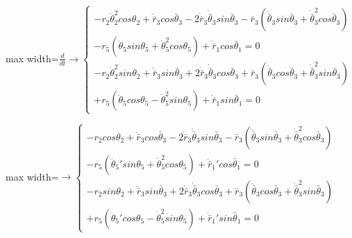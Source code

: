 \documentclass[11pt,a4paper]{article}
\begin{document}
\begin{center}\begin{adjustbox}{max width=\linewidth}$\displaystyle \frac{d}{dt}\rightarrow \left\{ \begin{gathered}-{r}_{2}{\dot{\theta }}_{2}^{2}cos{\theta }_{2}+{\ddot{\bar{r}}}_{3}cos{\bar{\theta }}_{3}-2{\dot{\bar{r}}}_{3}{\dot{\bar{\theta }}}_{3}sin{\bar{\theta }}_{3}-{\bar{r}}_{3}\left( {\ddot{\bar{\theta }}}_{3}sin{\bar{\theta }}_{3}+{\dot{\bar{\theta }}}_{3}^{2}cos{\bar{\theta }}_{3}\right)\\-{r}_{5}\left( {\ddot{\theta }}_{5}sin{\theta }_{5}+{\dot{\theta }}_{5}^{2}cos{\theta }_{5}\right)+{\ddot{\bar{r}}}_{1}cos{\bar{\theta }}_{1}=0\\-{r}_{2}{\dot{\theta }}_{2}^{2}sin{\theta }_{2}+{\ddot{\bar{r}}}_{3}sin{\bar{\theta }}_{3}+2{\dot{\bar{r}}}_{3}{\dot{\bar{\theta }}}_{3}cos{\bar{\theta }}_{3}+{\bar{r}}_{3}\left( {\ddot{\bar{\theta }}}_{3}cos{\bar{\theta }}_{3}+{\dot{\bar{\theta }}}_{3}^{2}sin{\bar{\theta }}_{3}\right)\\+{r}_{5}\left( {\ddot{\theta }}_{5}cos{\theta }_{5}-{\dot{\theta }}_{5}^{2}sin{\theta }_{5}\right)+{\ddot{\bar{r}}}_{1}sin{\bar{\theta }}_{1}=0\end{gathered}\right.$\end{adjustbox}\end{center}

\begin{center}\begin{adjustbox}{max width=\linewidth}$\displaystyle \rightarrow \left\{ \begin{gathered}-{r}_{2}cos{\theta }_{2}+{\ddot{\bar{r}}}_{3}cos{\bar{\theta }}_{3}-2{\dot{\bar{r}}}_{3}{\dot{\bar{\theta }}}_{3}sin{\bar{\theta }}_{3}-{\bar{r}}_{3}\left( {\ddot{\bar{\theta }}}_{3}sin{\bar{\theta }}_{3}+{\dot{\bar{\theta }}}_{3}^{2}cos{\bar{\theta }}_{3}\right)\\-{r}_{5}\left( {\ddot{\theta }}_{5}'sin{\theta }_{5}+{\dot{\theta }}_{5}^{2}cos{\theta }_{5}\right)+{\ddot{\bar{r}}}_{1}'cos{\bar{\theta }}_{1}=0\\-{r}_{2}sin{\theta }_{2}+{\ddot{\bar{r}}}_{3}sin{\bar{\theta }}_{3}+2{\dot{\bar{r}}}_{3}{\dot{\bar{\theta }}}_{3}cos{\bar{\theta }}_{3}+{\bar{r}}_{3}\left( {\ddot{\bar{\theta }}}_{3}cos{\bar{\theta }}_{3}+{\dot{\bar{\theta }}}_{3}^{2}sin{\bar{\theta }}_{3}\right)\\+{r}_{5}\left( {\ddot{\theta }}_{5}'cos{\theta }_{5}-{\dot{\theta }}_{5}^{2}sin{\theta }_{5}\right)+{\ddot{\bar{r}}}_{1}'sin{\bar{\theta }}_{1}=0\end{gathered}\right.$\end{adjustbox}\end{center}
\end{document}

